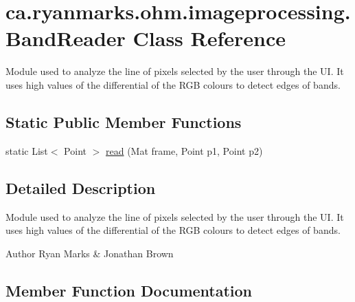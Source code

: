 \hypertarget{classca_1_1ryanmarks_1_1ohm_1_1imageprocessing_1_1_band_reader}{}\section{ca.\+ryanmarks.\+ohm.\+imageprocessing.\+Band\+Reader Class Reference}
\label{classca_1_1ryanmarks_1_1ohm_1_1imageprocessing_1_1_band_reader}


Module used to analyze the line of pixels selected by the user through the UI. It uses high values of the differential of the R\+GB colours to detect edges of bands.  


\subsection*{Static Public Member Functions}
\begin{DoxyCompactItemize}
\item 
static List$<$ Point $>$ \hyperlink{classca_1_1ryanmarks_1_1ohm_1_1imageprocessing_1_1_band_reader_a0cfd4ae277def310bec0748a4b9ec647}{read} (Mat frame, Point p1, Point p2)
\end{DoxyCompactItemize}


\subsection{Detailed Description}
Module used to analyze the line of pixels selected by the user through the UI. It uses high values of the differential of the R\+GB colours to detect edges of bands. 

\begin{DoxyAuthor}{Author}
Ryan Marks \& Jonathan Brown 
\end{DoxyAuthor}


\subsection{Member Function Documentation}
\hypertarget{classca_1_1ryanmarks_1_1ohm_1_1imageprocessing_1_1_band_reader_a0cfd4ae277def310bec0748a4b9ec647}{}\label{classca_1_1ryanmarks_1_1ohm_1_1imageprocessing_1_1_band_reader_a0cfd4ae277def310bec0748a4b9ec647} 
